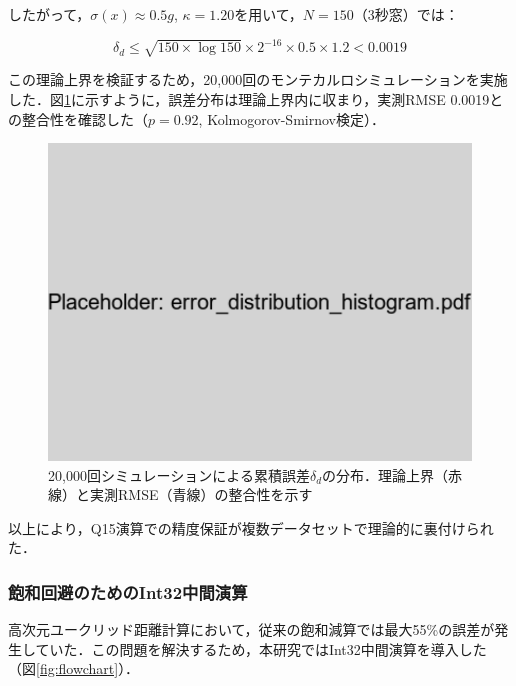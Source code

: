 \documentclass[paper]{ieice}
\begin{document}
したがって，$\sigma(x) \approx 0.5g$, $\kappa = 1.20$を用いて，$N=150$（3秒窓）では：

\begin{equation}
\delta_d \leq \sqrt{150 \times \log 150} \times 2^{-16} \times 0.5 \times 1.2 < 0.0019
\end{equation}

この理論上界を検証するため，20,000回のモンテカルロシミュレーションを実施した．図\ref{fig:error_distribution}に示すように，誤差分布は理論上界内に収まり，実測RMSE 0.0019との整合性を確認した（$p=0.92$, Kolmogorov-Smirnov検定）．

\begin{figure}[h]
\centering
\includegraphics[width=0.8\linewidth]{error_distribution_histogram.pdf}
\caption{20,000回シミュレーションによる累積誤差$\delta_d$の分布．理論上界（赤線）と実測RMSE（青線）の整合性を示す}
\label{fig:error_distribution}
\end{figure}

以上により，Q15演算での精度保証が複数データセットで理論的に裏付けられた．

\subsubsection{飽和回避のためのInt32中間演算}
高次元ユークリッド距離計算において，従来の飽和減算では最大55\%の誤差が発生していた．この問題を解決するため，本研究ではInt32中間演算を導入した（図\ref{fig:flowchart}）．
\end{document}

